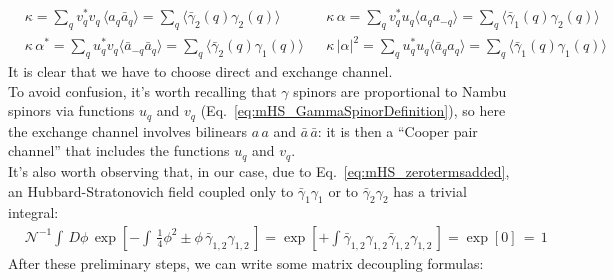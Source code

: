 \documentclass[a4paper,11pt, english]{article}
\theoremstyle{remark}
\newcommand{\mean}[1]{\ensuremath{\langle #1 \rangle}}
\newcommand{\nlspace}{\vskip 0.3cm}
\newcommand{\gammabar}{\bar{\gamma}}
\begin{document}
\begin{align*}
 &\kappa = \sum_q v_q^*v_q^{ }\,\mean{a_q\bar{a}_q}=\sum_q\mean{\bar{\gamma}_2(q)\gamma_2(q)} & &\kappa\,\alpha = \sum_q v^*_qu_q^{ }\mean{a_qa_{-q}}=\sum_q\mean{\bar{\gamma}_1(q)\gamma_2(q)}\\
 &\kappa\,\alpha^* = \sum_q u^*_qv_q^{ }\mean{\bar{a}_{-q}\bar{a}_{q}}=\sum_q\mean{\bar{\gamma}_2(q)\gamma_1(q)} & &\kappa\,|\alpha|^2 = \sum_q u_q^*u_q^{ }\mean{\bar{a}_qa_q}= \sum_q\mean{\bar{\gamma}_1(q)\gamma_1(q)}
\end{align*}
It is clear that we have to choose direct and exchange channel.\\ To avoid confusion, it's worth recalling that $\gamma$ spinors are proportional to Nambu spinors via functions $u_q$ and $v_q$ (Eq.~\eqref{eq:mHS_GammaSpinorDefinition}), so here the exchange channel involves bilinears $a\,a$ and $\bar{a}\,\bar{a}$: it is then a ``Cooper pair channel'' that includes the functions $u_q$ and $v_q$. \\ It's also worth observing that, in our case, due to Eq.~\eqref{eq:mHS_zerotermsadded}, an Hubbard-Stratonovich field coupled only to $\bar\gamma_1\gamma_1$ or to $\bar\gamma_2\gamma_2$ has a trivial integral:
\begin{align*}
 &\mathcal{N}^{-1} \int\,D\phi\,\exp\left[-\int\,\frac{1}{4}\phi^2 \pm \phi\,\gammabar_{1,2}^{ }\gamma_{1,2}^{ }\,\right] = \exp\left[+\int \gammabar_{1,2}^{ }\gamma_{1,2}^{ }\gammabar_{1,2}^{ }\gamma_{1,2}^{ }\,\right] = \exp[0]\,=\,1
\end{align*}
\nlspace
After these preliminary steps, we can write some matrix decoupling formulas:
\end{document}
